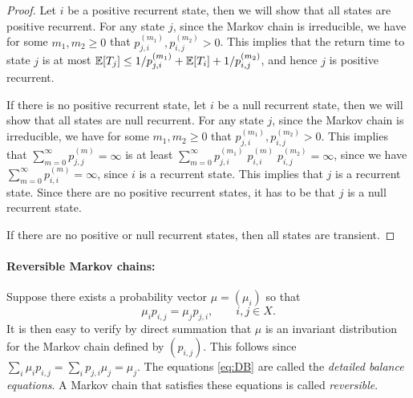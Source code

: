 \begin{proof}
Let $i$ be a positive recurrent state, then we will show that all
states are positive recurrent. For any state $j$, since the Markov
chain is irreducible, we have for some $m_1,m_2\geq 0$ that
$p^{(m_1)}_{j,i},p^{(m_2)}_{i,j}>0$. This implies that
the return
time to state $j$ is at most $\mathbb{E}[T_j]\leq
1/p^{(m_1)}_{j,i}+\mathbb{E}[T_i]+1/p^{(m_2)}_{i,j}$, and hence $j$ is
positive recurrent.

If there is no positive recurrent state, let $i$ be a null recurrent
state, then we will show that all states are null recurrent. For any
state $j$, since the Markov chain is irreducible, we have for some
$m_1,m_2\geq 0$ that $p^{(m_1)}_{j,i},p^{(m_2)}_{i,j}>0$. This implies that  $\sum_{m=0}^\infty p^{(m)}_{j,j}=\infty$
%
%
is at least
$\sum_{m=0}^\infty
p^{(m_1)}_{j,i}\;p^{(m)}_{i,i}\;p^{(m_2)}_{i,j}=\infty$, since we
have $\sum_{m=0}^\infty p^{(m)}_{i,i}=\infty$, since $i$ is a
recurrent state. This implies that $j$ is a recurrent state. Since
there are no positive recurrent states, it has to be that $j$ is a
null recurrent state.

If there are no positive or null recurrent states, then all states
are transient.
%
%
%
\end{proof}

\paragraph{Reversible Markov chains:} Suppose there exists a probability vector $\mu  = ({\mu_i})$ so that
\begin{equation}\label{eq:DB}
{\mu _i}{p_{i,j}} = {\mu _j}{p_{j,i}},\quad \quad i,j \in X.
\end{equation}
It is then easy to verify by direct summation that $\mu $ is an
invariant distribution for the Markov chain defined by
$({p_{i,j}})$. This follows since $\sum_i \mu_i p_{i,j}=\sum_i
p_{j,i}\mu_j=\mu_j$. The equations \eqref{eq:DB} are called the
\emph{detailed balance equations}. A Markov chain that satisfies
these equations is called \emph{reversible}.

